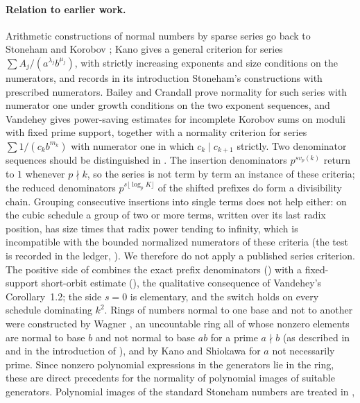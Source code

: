 \documentclass[11pt]{article}
\begin{document}
\paragraph{Relation to earlier work.} Arithmetic constructions of normal numbers by sparse series
go back to Stoneham \cite{Stoneham73} and Korobov \cite{Korobov72}; Kano \cite[Theorem~1]{Kano93} gives
a general criterion for series $\sum A_j/(a^{\lambda_j}b^{\mu_j})$, with strictly increasing exponents
and size conditions on the numerators, and records in its introduction Stoneham's constructions with
prescribed numerators. Bailey and Crandall \cite[Theorem~4.8]{BC02} prove normality for such series
with numerator one under growth conditions on the two exponent sequences, and Vandehey
\cite[Corollary~1.2 and Theorem~7.4]{Vandehey19} gives power-saving estimates for incomplete Korobov
sums on moduli with fixed prime support, together with a normality criterion for series
$\sum 1/(c_kb^{m_k})$ with numerator one in which $c_k\mid c_{k+1}$ strictly. Two denominator sequences
should be distinguished in . The insertion denominators $p^{sv_p(k)}$ return to $1$ whenever
$p\nmid k$, so the series is not term by term an instance of these criteria; the reduced denominators
$p^{s\lfloor\log_pK\rfloor}$ of the shifted prefixes do form a divisibility chain. Grouping consecutive
insertions into single terms does not help either: on the cubic schedule a group of two or more terms,
written over its last radix position, has size times that radix power tending to infinity, which is
incompatible with the bounded normalized numerators of these criteria (the test is recorded in the
ledger, ). We therefore do not apply a published series criterion. The positive side
of  combines the exact prefix denominators () with a fixed-support short-orbit
estimate (), the qualitative consequence of Vandehey's Corollary~1.2; the side $s=0$
is elementary, and the switch holds on every schedule dominating $k^2$. Rings of numbers normal to one
base and not to another were constructed by Wagner \cite{Wagner95}, an uncountable ring all of whose
nonzero elements are normal to base $b$ and not normal to base $ab$ for a prime $a\nmid b$ (as described
in \cite[\S1]{Kano93} and in the introduction of \cite{KS93}), and by Kano and Shiokawa
\cite[Theorem~5]{KS93} for $a$ not necessarily prime. Since nonzero polynomial expressions in the
generators lie in the ring, these are direct precedents for the normality of polynomial images of
suitable generators. Polynomial images of the standard Stoneham numbers are treated in \cite{PaperI},
\end{document}
